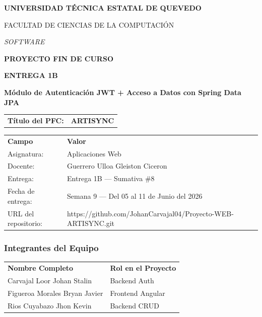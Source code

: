 \documentclass[
]{article}
\author{}
\date{}
\begin{document}
\textbf{UNIVERSIDAD TÉCNICA ESTATAL DE QUEVEDO}

FACULTAD DE CIENCIAS DE LA COMPUTACIÓN

\emph{SOFTWARE}

\textbf{PROYECTO FIN DE CURSO}

\textbf{ENTREGA 1B}

\textbf{Módulo de Autenticación JWT + Acceso a Datos con Spring Data
JPA}

\begin{longtable}[]{@{}
  >{\raggedright\arraybackslash}p{}
  >{\raggedright\arraybackslash}p{}@{}}
\toprule\noalign{}
\endhead
\bottomrule\noalign{}
\endlastfoot
\textbf{Título del PFC:} & \textbf{ARTISYNC} \\
\end{longtable}

\begin{longtable}[]{@{}
  >{\raggedright\arraybackslash}p{}
  >{\raggedright\arraybackslash}p{}@{}}
\toprule\noalign{}
\endhead
\bottomrule\noalign{}
\endlastfoot
\textbf{Campo} & \textbf{Valor} \\
Asignatura: & Aplicaciones Web \\
Docente: & Guerrero Ulloa Gleiston Ciceron \\
Entrega: & Entrega 1B --- Sumativa \#8 \\
Fecha de entrega: & Semana 9 --- Del 05 al 11 de Junio del 2026 \\
URL del repositorio: &
https://github.com/JohanCarvajal04/Proyecto-WEB-ARTISYNC.git \\
\end{longtable}

\subsubsection{Integrantes del Equipo}

\begin{longtable}[]{@{}
  >{\raggedright\arraybackslash}p{}
  >{\raggedright\arraybackslash}p{}@{}}
\toprule\noalign{}
\endhead
\bottomrule\noalign{}
\endlastfoot
\textbf{Nombre Completo} & \textbf{Rol en el Proyecto} \\
Carvajal Loor Johan Stalin & Backend Auth \\
Figueroa Morales Bryan Javier & Frontend Angular \\
Rios Cuyabazo Jhon Kevin & Backend CRUD \\
\end{longtable}
\end{document}
